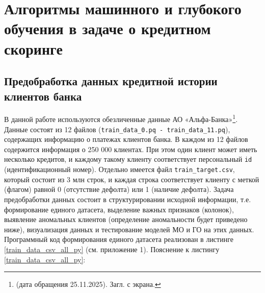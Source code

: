 \chapter{Алгоритмы машинного и глубокого обучения в задаче о кредитном скоринге}
      	
	\section{Предобработка данных кредитной истории клиентов банка}

	В данной работе используются обезличенные данные АО «Альфа-Банка»\footnote{\cite{Alfabank} (дата обращения 25.11.2025). Загл. с экрана.}. Данные состоят из 12 файлов (\texttt{train\_data\_0.pq - train\_data\_11.pq}), содержащих информацию о платежах клиентов банка. В каждом из 12 файлов содержится информация о 250 000 клиентах. При этом один клиент может иметь несколько кредитов, и каждому такому клиенту соответствует персональный \texttt{id} (идентификационный номер). Отдельно имеется файл \texttt{train\_target.csv}, который состоит из 3 млн строк, и каждая строка соответствует клиенту с меткой (флагом) равной 0 (отсутствие дефолта) или 1 (наличие дефолта). 
	Задача предобработки данных состоит в структурировании исходной информации, т.е. формирование единого датасета, выделение важных признаков (колонок), выявление аномальных клиентов (определение аномальности  будет приведено ниже), визуализация данных и тестирование моделей МО и ГО на этих данных. Программный код формирования единого датасета реализован в листинге \ref{train_data_csv_all_py} (см. приложение 1). 
{\co Пояснение к листингу \ref{train_data_csv_all_py}:}
